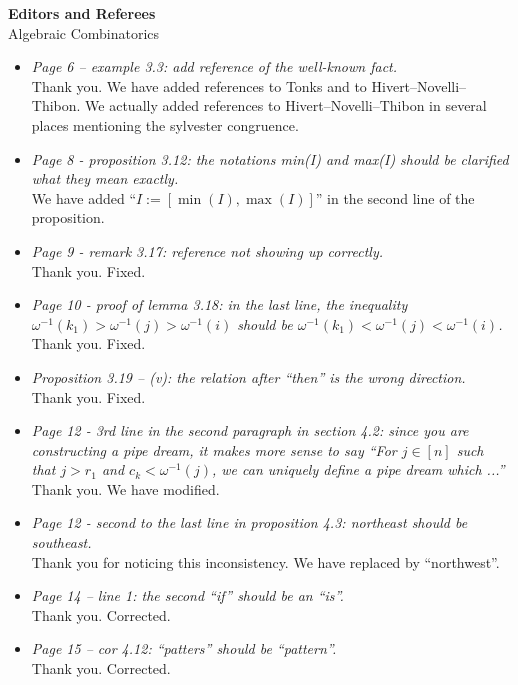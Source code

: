 \documentclass{letter}
\begin{document}
\begin{letter}{{\bf Editors and Referees} \\ Algebraic Combinatorics}
\begin{itemize}
\item \textsl{\color{gray} Page 6 -- example 3.3: add reference of the well-known fact.} \\
Thank you. We have added references to Tonks and to Hivert--Novelli--Thibon. We actually added references to Hivert--Novelli--Thibon in several places mentioning the sylvester congruence.

\item \textsl{\color{gray} Page 8 - proposition 3.12: the notations min(I) and max(I) should be clarified what they mean exactly.} \\
We have added ``$I := [\min(I), \max(I)]$'' in the second line of the proposition.

\item \textsl{\color{gray} Page 9 - remark 3.17: reference not showing up correctly.} \\
Thank you. Fixed.

\item \textsl{\color{gray} Page 10 - proof of lemma 3.18: in the last line, the inequality $\omega^{-1}(k_1)> \omega^{-1}(j) > \omega^{-1}(i)$ should be $\omega^{-1}(k_1)< \omega^{-1}(j) < \omega^{-1}(i)$.} \\
Thank you. Fixed.

\item \textsl{\color{gray} Proposition 3.19 -- (v): the relation after ``then'' is the wrong direction.} \\
Thank you. Fixed.

\item \textsl{\color{gray} Page 12 - 3rd line in the second paragraph in section 4.2: since you are constructing a pipe dream, it makes more sense to say ``For $j\in [n]$ such that $j>r_1$ and $c_k<\omega^{-1}(j)$, we can uniquely define a pipe dream which ...''} \\
Thank you. We have modified.

\item \textsl{\color{gray} Page 12 - second to the last line in proposition 4.3: northeast should be southeast.} \\
Thank you for noticing this inconsistency. We have replaced by ``northwest''.

\item \textsl{\color{gray} Page 14 -- line 1: the second ``if'' should be an ``is''.} \\
Thank you. Corrected.

\item \textsl{\color{gray} Page 15 -- cor 4.12: ``patters'' should be ``pattern''.} \\
Thank you. Corrected.


\end{itemize}
\end{letter}
\end{document}
